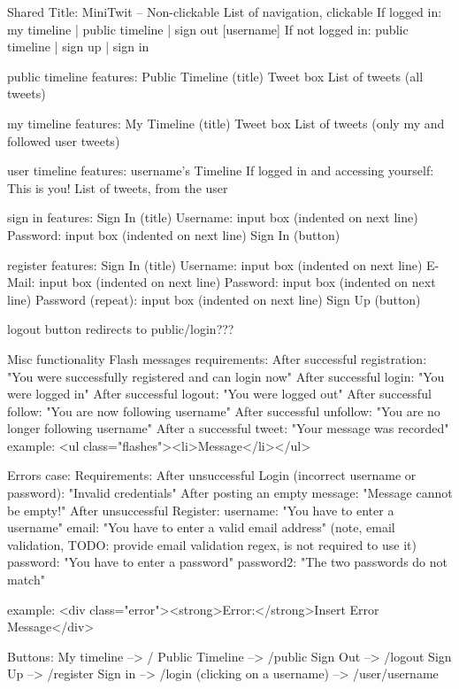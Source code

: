 Shared
    Title: MiniTwit -- Non-clickable
    List of navigation, clickable
        If logged in: my timeline | public timeline | sign out [username]
        If not logged in: public timeline | sign up | sign in

public timeline
    features:
        Public Timeline (title)
        Tweet box
        List of tweets (all tweets)

my timeline
    features:
        My Timeline (title)
        Tweet box
        List of tweets (only my and followed user tweets)

user timeline
    features:
        username's Timeline
        If logged in and accessing yourself: This is you!
        List of tweets, from the user

sign in
    features:
        Sign In (title)
        Username: input box (indented on next line)
        Password: input box (indented on next line)
        Sign In (button)

register
    features:
        Sign In (title)
        Username: input box (indented on next line)
        E-Mail: input box (indented on next line)
        Password: input box (indented on next line)
        Password (repeat): input box (indented on next line)
        Sign Up (button)

logout button
    redirects to public/login???

Misc functionality
    Flash messages
    requirements:
        After successful registration: "You were successfully registered and can login now"
        After successful login: "You were logged in"
        After successful logout: "You were logged out"
        After successful follow: "You are now following username"
        After successful unfollow: "You are no longer following username"
        After a successful tweet: "Your message was recorded"
    example:
        <ul class="flashes"><li>{Message}</li></ul>
        
    Errors
        case: 
        Requirements:
            After unsuccessful Login (incorrect username or password): "Invalid credentials"
            After posting an empty message: "Message cannot be empty!"
            After unsuccessful Register:
                username: "You have to enter a username"
                email: "You have to enter a valid email address" (note, email validation, TODO: provide email validation regex, is not required to use it)
                password: "You have to enter a password"
                password2: "The two passwords do not match"

    example:
        <div class="error"><strong>Error:</strong>{Insert Error Message}</div>

    Buttons:
        My timeline --> /
        Public Timeline --> /public
        Sign Out --> /logout
        Sign Up --> /register
        Sign in --> /login
        (clicking on a username) --> /user/{username}
